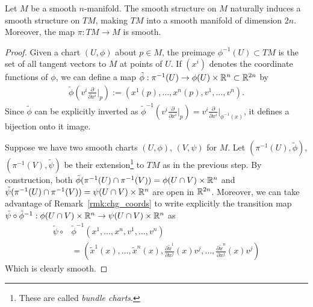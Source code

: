 \begin{theorem}
  Let $M$ be a smooth $n$-manifold.
  The smooth structure on $M$ naturally induces a smooth structure on $TM$, making $TM$ into a smooth manifold of dimension $2n$.
  Moreover, the map $\pi: TM \to M$ is smooth.
\end{theorem}
\begin{proof}
  Given a chart $(U,\phi)$ about $p\in M$, the preimage $\phi^{-1}(U) \subset TM$ is the set of all tangent vectors to $M$ at points of $U$.
  If $(x^i)$ denotes the coordinate functions of $\phi$, we can define a map $\tilde\phi : \pi^{-1}(U) \to \phi(U)\times\mathbb{R}^n \subset \mathbb{R}^{2n}$ by
  \begin{align}\label{eq:nat_coords}
    \tilde\phi\left(v^i \frac{\partial}{\partial x^i}\Big|_p\right) := \left(x^1(p), \ldots, x^n(p), v^1, \ldots, v^n\right).
  \end{align}
  Since $\tilde\phi$ can be explicitly inverted as $\tilde\phi^{-1}\left(v^i \frac{\partial}{\partial x^i}\Big|_p\right) = v^i \frac{\partial}{\partial x^i}\Big|_{\phi^{-1}(x)}$, it defines a bijection onto it image.

  Suppose we have two smooth charts $(U,\phi)$, $(V,\psi)$ for $M$.
  Let $(\pi^{-1}(U),\tilde\phi)$, $(\pi^{-1}(V),\tilde\psi)$ be their extension\footnote{These are called \emph{bundle charts}.} to $TM$ as in the previous step.
  By construction, both $\tilde\phi(\pi^{-1}(U)\cap\pi^{-1}(V)) = \phi(U\cap V)\times\mathbb{R}^n$ and $\tilde\psi(\pi^{-1}(U)\cap\pi^{-1}(V)) = \psi(U\cap V)\times\mathbb{R}^n$ are open in $\mathbb{R}^{2n}$.
  Moreover, we can take advantage of Remark~\ref{rmk:chg_coords} to write explicitly the transition map  $\tilde\psi\circ\tilde\phi^{-1}: \phi(U\cap V)\times\mathbb{R}^n \to \psi(U\cap V)\times\mathbb{R}^n$ as
  \begin{align}
    \tilde\psi\circ&\tilde\phi^{-1}\left(x^1, \ldots, x^n, v^1, \ldots, v^n\right) \\
    &=\left(\tilde x^1(x),\ldots, \tilde x^n(x), \frac{\partial \tilde x^1}{\partial x^j}(x) v^j, \ldots, \frac{\partial \tilde x^n}{\partial x^j}(x) v^j\right)
  \end{align}
  Which is clearly smooth.


\end{proof}
